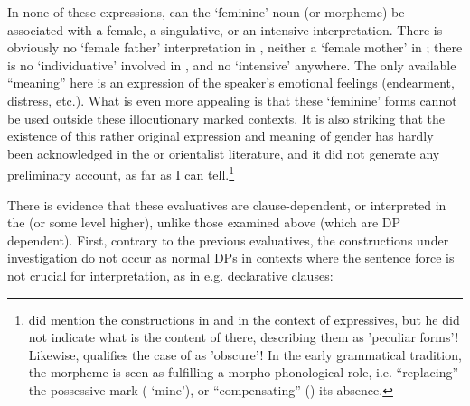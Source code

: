 In none of these expressions, can the `feminine' noun (or morpheme) be
associated with a female, a singulative, or an intensive interpretation. There
is obviously no `female father' interpretation in , neither a
`female mother' in ; there is no `individuative' involved in
, and no `intensive' anywhere. The only available ``meaning''
here is an expression of the speaker's emotional feelings (endearment,
distress, etc.). What is even more appealing is that these `feminine' forms
cannot be used outside these illocutionary marked contexts. It is also striking
that the existence of this rather original expression and meaning of gender has
hardly been acknowledged in the  or orientalist literature, and it did
not generate any preliminary account, as far as I can
tell.\footnote{\citet[II, 87--88]{Wright1971} did mention the constructions
in  and  in the context of expressives, but
he did not indicate what is the content of  there, describing them as
'peculiar forms'! Likewise, \citet[601]{HämeenAnttila2000} qualifies the case
of  as 'obscure'! In the early  grammatical
tradition, the morpheme  is seen as fulfilling a morpho-phonological
role, i.e. ``replacing'' the possessive mark ( `mine'), or ``compensating''
() its absence. 
}

There is evidence that these evaluatives are clause-dependent, or interpreted
in the  (or some level higher), unlike those examined above (which are DP
dependent). First, contrary to the previous evaluatives, the constructions
under investigation do not occur as normal DPs in contexts where the sentence
force is not crucial for interpretation, as in e.g. declarative clauses:

\begin{exe}
  \ex\label{ex:fassi:46}
  \begin{xlist}
  \end{xlist}
\end{exe}

